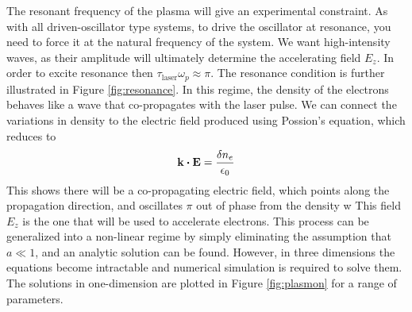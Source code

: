 \documentclass[12pt,letter]{article}
\begin{document}
The resonant frequency of the plasma will give an experimental constraint. As
with all driven-oscillator type systems, to drive the oscillator at resonance,
you need to force it at the natural frequency of the system. We want
high-intensity waves, as their amplitude will ultimately determine the
accelerating field $E_z$. In order to excite resonance then $\tau_\textrm{laser}
\omega_p \approx \pi$. The resonance condition is further illustrated in Figure
\ref{fig:resonance}.
In this regime, the density of the electrons behaves like a wave that
co-propagates with the laser pulse. We can connect the variations in density to
the electric field produced using Possion's equation, which reduces to
\begin{equation}
    \vb{k}\dotproduct\vb{E} = \frac{\delta n_e}{\epsilon_0}
\end{equation}
This shows there will be a co-propagating electric field, which points along
the propagation direction, and oscillates $\pi$ out of phase from the density
w
This field $E_z$ is the one that will be used to accelerate electrons.
This process can be generalized into a non-linear regime by simply eliminating
the assumption that $a \ll 1$, and an analytic solution can be found. However, in three
dimensions the equations become intractable and numerical simulation is
required to solve them. The solutions in one-dimension are plotted in Figure \ref{fig:plasmon}
for a range of parameters.
\end{document}
